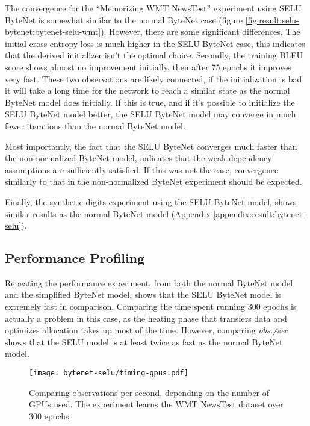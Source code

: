 The convergence for the ``Memorizing WMT NewsTest'' experiment using SELU ByteNet is somewhat similar to the normal ByteNet case (figure \ref{fig:result:selu-bytenet:bytenet-selu-wmt}). However, there are some significant differences. The initial cross entropy loss is much higher in the SELU ByteNet case, this indicates that the derived initializer isn't the optimal choice. Secondly, the training BLEU score shows almost no improvement initially, then after 75 epochs it improves very fast. These two observations are likely connected, if the initialization is bad it will take a long time for the network to reach a similar state as the normal ByteNet model does initially. If this is true, and if it's possible to initialize the SELU ByteNet model better, the SELU ByteNet model may converge in much fewer iterations than the normal ByteNet model.

Most importantly, the fact that the SELU ByteNet converges much faster than the non-normalized ByteNet model, indicates that the weak-dependency assumptions are sufficiently satisfied. If this was not the case, convergence similarly to that in the non-normalized ByteNet experiment should be expected.

Finally, the synthetic digits experiment using the SELU ByteNet model, shows similar results as the normal ByteNet model (Appendix \ref{appendix:result:bytenet-selu}).

\clearpage
\subsection{Performance Profiling}

Repeating the performance experiment, from both the normal ByteNet model and the simplified ByteNet model, shows that the SELU ByteNet model is extremely fast in comparison. Comparing the time spent running 300 epochs is actually a problem in this case, as the heating phase that transfers data and optimizes allocation takes up most of the time. However, comparing \textit{obs./sec} shows that the SELU model is at least twice as fast as the normal ByteNet model.

\begin{figure}[h]
    \centering
    \texttt{[image: bytenet-selu/timing-gpus.pdf]}
    \caption{Comparing observations per second, depending on the number of GPUs used. The experiment learns the WMT NewsTest dataset over 300 epochs.}
    \label{fig:result:selu-bytenet:timing-gpus}
\end{figure}

